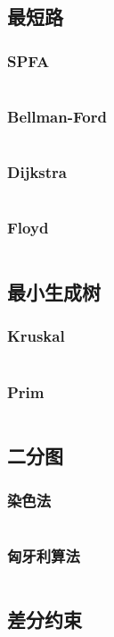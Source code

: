\documentclass[a4paper,12pt]{article}
\begin{document}
\subsection{最短路} %
\subsubsection{SPFA}
\inputminted[breaklines]{c++}{graph/shortest_path/spfa.cc}
\subsubsection{Bellman-Ford}
\inputminted[breaklines]{c++}{graph/shortest_path/bellman.cc}
\subsubsection{Dijkstra}
\inputminted[breaklines]{c++}{graph/shortest_path/dij.cc}
\subsubsection{Floyd}
\inputminted[breaklines]{c++}{graph/shortest_path/floyd.cc}
\subsection{最小生成树} %
\subsubsection{Kruskal} 
\inputminted[breaklines]{c++}{graph/mst/kruskal.cc}
\subsubsection{Prim} 
\inputminted[breaklines]{c++}{graph/mst/prim.cc}
\subsection{二分图} %
\subsubsection{染色法} 
\inputminted[breaklines]{c++}{graph/2graph/judge.cc}
\subsubsection{匈牙利算法} 
\inputminted[breaklines]{c++}{graph/2graph/xyl.cc}
\subsection{差分约束} %
\inputminted[breaklines]{c++}{graph/cfys/cfys.cc}
\end{document}
